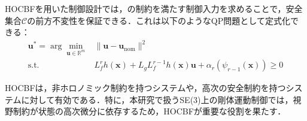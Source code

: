 HOCBFを用いた制御設計では，の制約を満たす制御入力を求めることで，安全集合$\mathcal{C}$の前方不変性を保証できる．これは以下のようなQP問題として定式化できる：
\begin{equation}
\begin{aligned}
\mathbf{u}^* = \arg\min_{\mathbf{u} \in \mathbb{R}^m} & \|\mathbf{u} - \mathbf{u}_{\text{nom}}\|^2 \\
\text{s.t.} & L_f^r h(\mathbf{x}) + L_g L_f^{r-1} h(\mathbf{x})\mathbf{u} + \alpha_r(\psi_{r-1}(\mathbf{x})) \geq 0
\label{eq:hocbf_qp}
\end{aligned}
\end{equation}

HOCBFは，非ホロノミック制約を持つシステムや，高次の安全制約を持つシステムに対して有効である．特に，本研究で扱うSE(3)上の剛体運動制御では，視野制約が状態の高次微分に依存するため，HOCBFが重要な役割を果たす．
